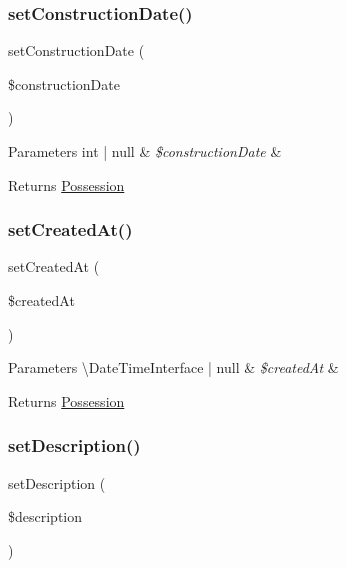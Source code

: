 \subsubsection{\texorpdfstring{setConstructionDate()}{setConstructionDate()}}
{\footnotesize\ttfamily set\+Construction\+Date (\begin{DoxyParamCaption}\item[{?int}]{\$construction\+Date }\end{DoxyParamCaption})}


\begin{DoxyParams}[1]{Parameters}
int | null & {\em \$construction\+Date} & \\
\hline
\end{DoxyParams}
\begin{DoxyReturn}{Returns}
\mbox{\hyperlink{class_app_1_1_entity_1_1_possession}{Possession}} 
\end{DoxyReturn}
\mbox{\label{class_app_1_1_entity_1_1_possession_a22e870fed7fbb2911e3b9bece07dc78d}} 
\subsubsection{\texorpdfstring{setCreatedAt()}{setCreatedAt()}}
{\footnotesize\ttfamily set\+Created\+At (\begin{DoxyParamCaption}\item[{?\textbackslash{}Date\+Time\+Interface}]{\$created\+At }\end{DoxyParamCaption})}


\begin{DoxyParams}[1]{Parameters}
\textbackslash{}\+Date\+Time\+Interface | null & {\em \$created\+At} & \\
\hline
\end{DoxyParams}
\begin{DoxyReturn}{Returns}
\mbox{\hyperlink{class_app_1_1_entity_1_1_possession}{Possession}} 
\end{DoxyReturn}
\mbox{\label{class_app_1_1_entity_1_1_possession_acee77db44e361e2773e2734033f2a1c5}} 
\subsubsection{\texorpdfstring{setDescription()}{setDescription()}}
{\footnotesize\ttfamily set\+Description (\begin{DoxyParamCaption}\item[{?string}]{\$description }\end{DoxyParamCaption})}



